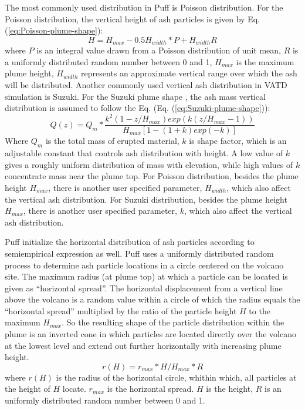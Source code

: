 \documentclass[utf8]{frontiersSCNS} %
\begin{document}
The most commonly used distribution in Puff is Poisson distribution. For the Poisson distribution, the vertical height of ash particles is given by Eq. (\ref{eq:Poisson-plume-shape}):
\begin{equation}
H=H_{max} - 0.5 H_{width}*P+H_{width}R
\label{eq:Poisson-plume-shape}
\end{equation}
where $P$ is an integral value drawn from a Poisson distribution of unit mean, $R$ is a uniformly distributed random number between 0 and 1, $H_{max}$ is the maximum plume height, $H_{width}$ represents an approximate vertical range over which the ash will be distributed.
Another commonly used vertical ash distribution in VATD simulation is Suzuki. For the Suzuki plume shape \citep{suzuki1983theoretical}, the ash mass vertical distribution is assumed to follow the Eq. (Eq. (\ref{eq:Suzuki-plume-shape})):
\begin{equation}
Q(z)=Q_m* \frac{k^2(1-z/H_{max})exp\left(k(z/H_{max} -1 )\right)}{H_{max}\left[1-(1+k)exp(-k)\right]}
\label{eq:Suzuki-plume-shape}
\end{equation}
Where $Q_m$ is the total mass of erupted material, $k$ is shape factor, which is an adjustable constant that controls ash distribution with height. A low value of $k$ gives a roughly uniform distribution of mass with elevation, while high values of $k$ concentrate mass near the plume top.
For Poisson distribution, besides the plume height $H_{max}$, there is another user specified parameter, $H_{width}$, which also affect the vertical ash distribution. For Suzuki distribution, besides the plume height $H_{max}$, there is another user specified parameter, $k$, which also affect the vertical ash distribution.

Puff initialize the horizontal distribution of ash particles according to semiempirical expression as well. Puff uses a uniformly distributed random process to determine ash particle locations in a circle centered on the volcano site. The maximum radius (at plume top) at which a particle can be located is given as ``horizontal spread''. The horizontal displacement from a vertical line above the volcano is a random value within a circle of which the radius equals the ``horizontal spread'' multiplied by the ratio of the particle height $H$ to the maximum $H_{max}$. So the resulting shape of the particle distribution within the plume is an inverted cone in which particles are located directly over the volcano at the lowest level and extend out further horizontally with increasing plume height.
\begin{equation}
r(H)= r_{max} * H / H_{max} * R
\label{eq:horizontal-particle-distribution} 
\end{equation}
where $r(H)$ is the radius of the horizontal circle, whithin which, all particles at the height of $H$ locate. $r_{max}$ is the horizontal spread. $H$ is the height, $R$ is an uniformly distributed random number between 0 and 1.
\end{document}
